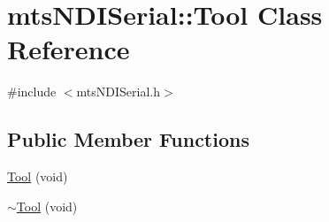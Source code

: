 \hypertarget{classmts_n_d_i_serial_1_1_tool}{}\section{mts\+N\+D\+I\+Serial\+:\+:Tool Class Reference}
\label{classmts_n_d_i_serial_1_1_tool}


{\ttfamily \#include $<$mts\+N\+D\+I\+Serial.\+h$>$}

\subsection*{Public Member Functions}
\begin{DoxyCompactItemize}
\item 
\hyperlink{classmts_n_d_i_serial_1_1_tool_a39a0ab6a716a320766ed0eb059aba993}{Tool} (void)
\item 
\hyperlink{classmts_n_d_i_serial_1_1_tool_a694fff39bf4ae020486a8ad3e6da9db2}{$\sim$\+Tool} (void)
\end{DoxyCompactItemize}
